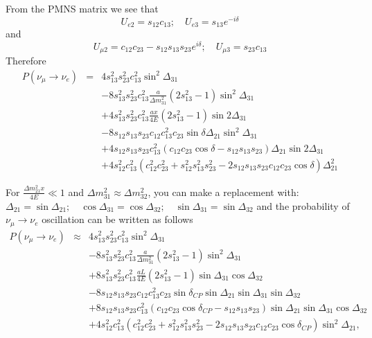 \documentclass[a4 paper,12pt]{report}%
\begin{document}
From the PMNS matrix we see that
$$U_{e2} = s_{12}c_{13};\quad U_{e3} = s_{13}e^{-i\delta}$$
and
$$U_{\mu 2} = c_{12}c_{23}-s_{12}s_{13}s_{23}e^{i\delta}; \quad U_{\mu 3} = s_{23}c_{13}$$
Therefore
 \begin{eqnarray}\label{75} \nonumber
P(\nu_\mu \rightarrow \nu_e) &=&4s^2_{13}s^2_{23}c^2_{13}\sin^2\Delta_{31}\\ \nonumber
&&-8s^2_{13}s^2_{23}c^2_{13}\frac{a}{\Delta m^2_{31}}(2s_{13}^2- 1)\sin^2\Delta_{31}\\ \nonumber
&&+ 4s^2_{13}s^2_{23}c^2_{13}\frac{ax}{4E}(2s_{13}^2-1)\sin2\Delta_{31}\\ \nonumber
&&- 8s_{12}s_{13}s_{23}c_{12}c^2_{13}c_{23}\sin\delta \Delta_{21}\sin^2\Delta_{31}\\ \nonumber
&&+4s_{12}s_{13}s_{23}c^2_{13}(c_{12}c_{23}\cos\delta - s_{12}s_{13}s_{23})\Delta_{21}\sin2\Delta_{31} \\
&&+4s^2_{12}c^2_{13}(c^2_{12}c^2_{23} + s^2_{12}s^2_{13}s^2_{23} - 2s_{12}s_{13}s_{23}c_{12}c_{23}\cos\delta)\Delta_{21}^2
\end{eqnarray}\par
For $\frac{\Delta m^2_{21}x}{4E} \ll 1$ and $\Delta m^2_{31} \approx \Delta m^2_{32}$, you can make a replacement with: $\Delta_{21} = \sin\Delta_{21}; \quad \cos\Delta_{31} = \cos\Delta_{32}; \quad \sin\Delta_{31} = \sin\Delta_{32}$ and the probability of $\nu_{\mu} \rightarrow \nu_e$ oscillation can be written as follows
 \begin{eqnarray}\label{eq:5} \nonumber
P(\nu_\mu \rightarrow \nu_e) &\approx &4s^2_{13}s^2_{23}c^2_{13}\sin^2\Delta_{31}\\ \nonumber
&&-8s^2_{13}s^2_{23}c^2_{13}\frac{a}{\Delta m^2_{31}}(2s_{13}^2- 1)\sin^2\Delta_{31}\\ 
&&+ 8s^2_{13}s^2_{23}c^2_{13}\frac{aL}{4E}(2s_{13}^2-1)\sin\Delta_{31}\cos\Delta_{32}\\ \nonumber
&&- 8s_{12}s_{13}s_{23}c_{12}c^2_{13}c_{23}\sin\delta_{CP} \sin\Delta_{21}\sin\Delta_{31}\sin\Delta_{32}\\ \nonumber
&&+8s_{12}s_{13}s_{23}c^2_{13}(c_{12}c_{23}\cos\delta_{CP} - s_{12}s_{13}s_{23})\sin\Delta_{21}\sin\Delta_{31}\cos\Delta_{32} \\ \nonumber
&&+4s^2_{12}c^2_{13}(c^2_{12}c^2_{23} + s^2_{12}s^2_{13}s^2_{23} - 2s_{12}s_{13}s_{23}c_{12}c_{23}\cos\delta_{CP})\sin^2\Delta_{21},
\end{eqnarray}
\end{document}
